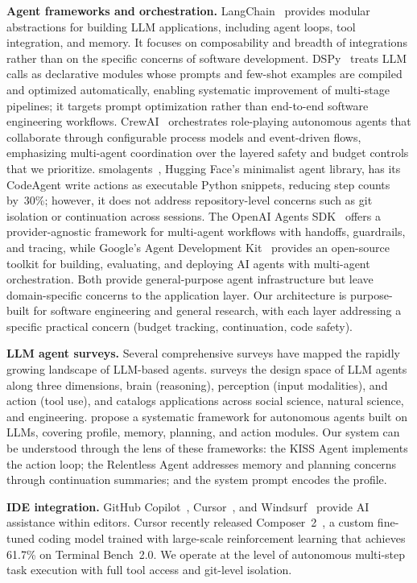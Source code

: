 \documentclass{article}
\begin{document}
\textbf{Agent frameworks and orchestration.} LangChain~\citep{langchain2022} provides modular abstractions for building LLM applications, including agent loops, tool integration, and memory. It focuses on composability and breadth of integrations rather than on the specific concerns of software development.  DSPy~\citep{khattab2024dspy} treats LLM calls as declarative modules whose prompts and few-shot examples are compiled and optimized automatically, enabling systematic improvement of multi-stage pipelines; it targets prompt optimization rather than end-to-end software engineering workflows.  CrewAI~\citep{crewai2024} orchestrates role-playing autonomous agents that collaborate through configurable process models and event-driven flows, emphasizing multi-agent coordination over the layered safety and budget controls that we prioritize.  smolagents~\citep{smolagents2025}, Hugging Face's minimalist agent library, has its CodeAgent write actions as executable Python snippets, reducing step counts by~30\%; however, it does not address repository-level concerns such as git isolation or continuation across sessions.  The OpenAI Agents SDK~\citep{openaiagentssdk2025} offers a provider-agnostic framework for multi-agent workflows with handoffs, guardrails, and tracing, while Google's Agent Development Kit~\citep{googleadk2025} provides an open-source toolkit for building, evaluating, and deploying AI agents with multi-agent orchestration.  Both provide general-purpose agent infrastructure but leave domain-specific concerns to the application layer.  Our architecture is purpose-built for software engineering and general research, with each layer addressing a specific practical concern (budget tracking, continuation, code safety).

\textbf{LLM agent surveys.} Several comprehensive surveys have mapped the rapidly growing landscape of LLM-based agents. \citet{xi2023rise} surveys the design space of LLM agents along three dimensions, brain (reasoning), perception (input modalities), and action (tool use), and catalogs applications across social science, natural science, and engineering. \citet{wang2024survey} propose a systematic framework for autonomous agents built on LLMs, covering profile, memory, planning, and action modules.  Our system can be understood through the lens of these frameworks: the KISS Agent implements the action loop; the Relentless Agent addresses memory and planning concerns through continuation summaries; and the system prompt encodes the profile.

\textbf{IDE integration.} GitHub Copilot~\citep{copilot2021}, Cursor~\citep{cursor2024}, and Windsurf~\citep{windsurf2024} provide AI assistance within editors. Cursor recently released Composer~2~\citep{cursor2026composer2}, a custom fine-tuned coding model trained with large-scale reinforcement learning that achieves 61.7\% on Terminal Bench~2.0. We operate at the level of autonomous multi-step task execution with full tool access and git-level isolation.
\end{document}
